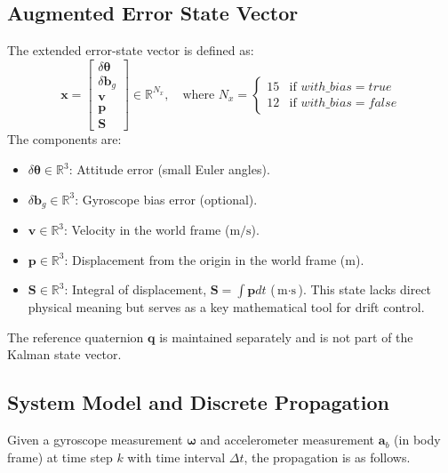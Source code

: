 \documentclass[11pt]{article}
\begin{document}
\subsection{Augmented Error State Vector}
The extended error-state vector is defined as:
\begin{equation}
\bm{x} = \begin{bmatrix}
\delta \bm{\theta} \\
\delta \bm{b}_g \\
\bm{v} \\
\bm{p} \\
\bm{S}
\end{bmatrix} \in \mathbb{R}^{N_x}, \quad \text{where } N_x = \begin{cases}
15 & \text{if } with\_bias = true \\
12 & \text{if } with\_bias = false
\end{cases}
\end{equation}
The components are:
\begin{itemize}
  \item $\delta \bm{\theta} \in \mathbb{R}^3$: Attitude error (small Euler angles).
  \item $\delta \bm{b}_g \in \mathbb{R}^3$: Gyroscope bias error (optional).
  \item $\bm{v} \in \mathbb{R}^3$: Velocity in the world frame ($\text{m/s}$).
  \item $\bm{p} \in \mathbb{R}^3$: Displacement from the origin in the world frame ($\text{m}$).
  \item $\bm{S} \in \mathbb{R}^3$: Integral of displacement, $\bm{S} = \int \bm{p}  dt$ ($\text{m}\cdot\text{s}$). This state lacks direct physical meaning but serves as a key mathematical tool for drift control.
\end{itemize}
The reference quaternion $\bm{q}$ is maintained separately and is not part of the Kalman state vector.

\subsection{System Model and Discrete Propagation}
\label{ssec:propagation}

Given a gyroscope measurement $\bm{\omega}$ and accelerometer measurement $\bm{a}_b$ (in body frame) at time step $k$ with time interval $\Delta t$, the propagation is as follows.
\end{document}
